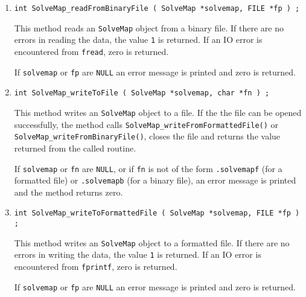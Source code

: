 \begin{enumerate}
\item
\begin{verbatim}
int SolveMap_readFromBinaryFile ( SolveMap *solvemap, FILE *fp ) ;
\end{verbatim}
\par
This method reads an {\tt SolveMap} object from a binary file.
If there are no errors in reading the data, 
the value {\tt 1} is returned.
If an IO error is encountered from {\tt fread}, zero is returned.
\par {}
If {\tt solvemap} or {\tt fp} are {\tt NULL} an error message 
is printed and zero is returned.
\item
\begin{verbatim}
int SolveMap_writeToFile ( SolveMap *solvemap, char *fn ) ;
\end{verbatim}
\par
This method writes an {\tt SolveMap} object to a file.
If the the file can be opened successfully, 
the method calls {\tt SolveMap\_writeFromFormattedFile()} or
{\tt SolveMap\_writeFromBinaryFile()}, 
closes the file
and returns the value returned from the called routine.
\par {}
If {\tt solvemap} or {\tt fn} are {\tt NULL}, 
or if {\tt fn} is not of the form
{\tt *.solvemapf} (for a formatted file) 
or {\tt *.solvemapb} (for a binary file),
an error message is printed and the method returns zero.
\item
\begin{verbatim}
int SolveMap_writeToFormattedFile ( SolveMap *solvemap, FILE *fp ) ;
\end{verbatim}
\par
This method writes an {\tt SolveMap} object to a formatted file.
If there are no errors in writing the data, 
the value {\tt 1} is returned.
If an IO error is encountered from {\tt fprintf}, zero is returned.
\par {}
If {\tt solvemap} or {\tt fp} are {\tt NULL} an error message is printed and
zero is returned.

\end{enumerate}
